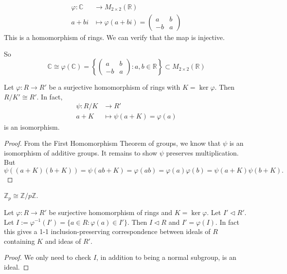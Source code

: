 
\begin{example}
	\begin{align*}
		\varphi: \mathbb{C} &\longrightarrow M_{2\times 2}(\mathbb{R}) \\
		a+bi &\longmapsto \varphi(a+bi) = 
	\left(\begin{array}{rr}a & b \\ -b & a\end{array}\right)
\end{align*}
This is a homomorphism of rings. We can verify that the map is injective.

So
\[
	\mathbb{C} \cong \varphi(\mathbb{C}) = \left\{
	\left(\begin{array}{rr}a & b \\ -b & a\end{array}\right):a,b \in \mathbb{R}
\right\} \subset M_{2\times 2}(\mathbb{R})
\]
\end{example}

\begin{theorem}
	Let $\varphi: R \to R'$ be a surjective homomorphism of rings with $K = \operatorname{ker} \varphi$. Then $R / K' \cong R'$.
	In fact, 
	\begin{align*}
		\psi: R / K &\longrightarrow R' \\
		a + K &\longmapsto \psi(a + K) = \varphi(a)
	\end{align*}
	is an isomorphism.
\end{theorem}
\begin{proof}
	From the First Homomorphism Theorem of groups, we know that $\psi$ is an isomorphism of additive groups. It remains to show $\psi$ preserves multiplication. But
	\[
		\psi\left( (a+K)(b+K) \right) 
		=\psi\left( ab+K \right) 
		=\varphi(ab)
		=\varphi(a)\varphi(b)
		=\psi\left( a+K \right) \psi\left( b+K \right) 
	.\] 
\end{proof}
\begin{example}
	$\mathbb{Z}_p \cong \mathbb{Z} / p \mathbb{Z}$.
\end{example}

\begin{theorem}
	Let $\varphi: R \to R'$ be surjective homomorphism of rings and $K = \operatorname{ker} \varphi$. Let $I' \triangleleft R'$. Let $I :=\varphi^{-1} (I') = \{a \in R: \varphi(a)\in I'\} $. Then $I \triangleleft R$ and $I' = \varphi(I)$. In fact this gives a 1-1 inclusion-preserving correspondence between ideals of $R$ containing $K$ and ideas of $R'$.
\end{theorem}
\begin{proof}
	We only need to check $I$, in addition to being a normal subgroup, is an ideal.
\end{proof}

